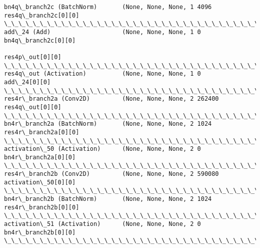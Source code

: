 \documentclass[11pt]{article}
\begin{document}
\begin{Verbatim}[commandchars=\\\{\}]
bn4q\_branch2c (BatchNorm)       (None, None, None, 1 4096        res4q\_branch2c[0][0]             
\_\_\_\_\_\_\_\_\_\_\_\_\_\_\_\_\_\_\_\_\_\_\_\_\_\_\_\_\_\_\_\_\_\_\_\_\_\_\_\_\_\_\_\_\_\_\_\_\_\_\_\_\_\_\_\_\_\_\_\_\_\_\_\_\_\_\_\_\_\_\_\_\_\_\_\_\_\_\_\_\_\_\_\_\_\_\_\_\_\_\_\_\_\_\_\_\_\_
add\_24 (Add)                    (None, None, None, 1 0           bn4q\_branch2c[0][0]              
                                                                 res4p\_out[0][0]                  
\_\_\_\_\_\_\_\_\_\_\_\_\_\_\_\_\_\_\_\_\_\_\_\_\_\_\_\_\_\_\_\_\_\_\_\_\_\_\_\_\_\_\_\_\_\_\_\_\_\_\_\_\_\_\_\_\_\_\_\_\_\_\_\_\_\_\_\_\_\_\_\_\_\_\_\_\_\_\_\_\_\_\_\_\_\_\_\_\_\_\_\_\_\_\_\_\_\_
res4q\_out (Activation)          (None, None, None, 1 0           add\_24[0][0]                     
\_\_\_\_\_\_\_\_\_\_\_\_\_\_\_\_\_\_\_\_\_\_\_\_\_\_\_\_\_\_\_\_\_\_\_\_\_\_\_\_\_\_\_\_\_\_\_\_\_\_\_\_\_\_\_\_\_\_\_\_\_\_\_\_\_\_\_\_\_\_\_\_\_\_\_\_\_\_\_\_\_\_\_\_\_\_\_\_\_\_\_\_\_\_\_\_\_\_
res4r\_branch2a (Conv2D)         (None, None, None, 2 262400      res4q\_out[0][0]                  
\_\_\_\_\_\_\_\_\_\_\_\_\_\_\_\_\_\_\_\_\_\_\_\_\_\_\_\_\_\_\_\_\_\_\_\_\_\_\_\_\_\_\_\_\_\_\_\_\_\_\_\_\_\_\_\_\_\_\_\_\_\_\_\_\_\_\_\_\_\_\_\_\_\_\_\_\_\_\_\_\_\_\_\_\_\_\_\_\_\_\_\_\_\_\_\_\_\_
bn4r\_branch2a (BatchNorm)       (None, None, None, 2 1024        res4r\_branch2a[0][0]             
\_\_\_\_\_\_\_\_\_\_\_\_\_\_\_\_\_\_\_\_\_\_\_\_\_\_\_\_\_\_\_\_\_\_\_\_\_\_\_\_\_\_\_\_\_\_\_\_\_\_\_\_\_\_\_\_\_\_\_\_\_\_\_\_\_\_\_\_\_\_\_\_\_\_\_\_\_\_\_\_\_\_\_\_\_\_\_\_\_\_\_\_\_\_\_\_\_\_
activation\_50 (Activation)      (None, None, None, 2 0           bn4r\_branch2a[0][0]              
\_\_\_\_\_\_\_\_\_\_\_\_\_\_\_\_\_\_\_\_\_\_\_\_\_\_\_\_\_\_\_\_\_\_\_\_\_\_\_\_\_\_\_\_\_\_\_\_\_\_\_\_\_\_\_\_\_\_\_\_\_\_\_\_\_\_\_\_\_\_\_\_\_\_\_\_\_\_\_\_\_\_\_\_\_\_\_\_\_\_\_\_\_\_\_\_\_\_
res4r\_branch2b (Conv2D)         (None, None, None, 2 590080      activation\_50[0][0]              
\_\_\_\_\_\_\_\_\_\_\_\_\_\_\_\_\_\_\_\_\_\_\_\_\_\_\_\_\_\_\_\_\_\_\_\_\_\_\_\_\_\_\_\_\_\_\_\_\_\_\_\_\_\_\_\_\_\_\_\_\_\_\_\_\_\_\_\_\_\_\_\_\_\_\_\_\_\_\_\_\_\_\_\_\_\_\_\_\_\_\_\_\_\_\_\_\_\_
bn4r\_branch2b (BatchNorm)       (None, None, None, 2 1024        res4r\_branch2b[0][0]             
\_\_\_\_\_\_\_\_\_\_\_\_\_\_\_\_\_\_\_\_\_\_\_\_\_\_\_\_\_\_\_\_\_\_\_\_\_\_\_\_\_\_\_\_\_\_\_\_\_\_\_\_\_\_\_\_\_\_\_\_\_\_\_\_\_\_\_\_\_\_\_\_\_\_\_\_\_\_\_\_\_\_\_\_\_\_\_\_\_\_\_\_\_\_\_\_\_\_
activation\_51 (Activation)      (None, None, None, 2 0           bn4r\_branch2b[0][0]              
\_\_\_\_\_\_\_\_\_\_\_\_\_\_\_\_\_\_\_\_\_\_\_\_\_\_\_\_\_\_\_\_\_\_\_\_\_\_\_\_\_\_\_\_\_\_\_\_\_\_\_\_\_\_\_\_\_\_\_\_\_\_\_\_\_\_\_\_\_\_\_\_\_\_\_\_\_\_\_\_\_\_\_\_\_\_\_\_\_\_\_\_\_\_\_\_\_\_

\end{Verbatim}
\end{document}

